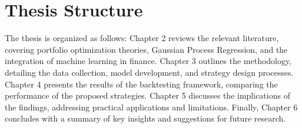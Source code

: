 \section{Thesis Structure}
The thesis is organized as follows: Chapter 2 reviews the relevant literature, covering portfolio optimization theories, Gaussian Process Regression, and the integration of machine learning in finance. Chapter 3 outlines the methodology, detailing the data collection, model development, and strategy design processes. Chapter 4 presents the results of the backtesting framework, comparing the performance of the proposed strategies. Chapter 5 discusses the implications of the findings, addressing practical applications and limitations. Finally, Chapter 6 concludes with a summary of key insights and suggestions for future research.
